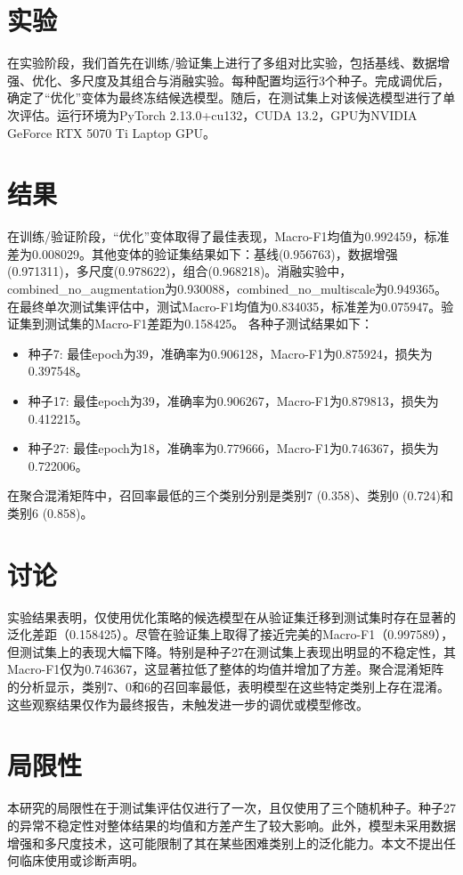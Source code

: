 \documentclass[10pt]{article}
\begin{document}
\section{实验}
在实验阶段，我们首先在训练/验证集上进行了多组对比实验，包括基线、数据增强、优化、多尺度及其组合与消融实验。每种配置均运行3个种子。完成调优后，确定了“优化”变体为最终冻结候选模型。随后，在测试集上对该候选模型进行了单次评估。运行环境为PyTorch 2.13.0+cu132，CUDA 13.2，GPU为NVIDIA GeForce RTX 5070 Ti Laptop GPU。
\section{结果}
在训练/验证阶段，“优化”变体取得了最佳表现，Macro-F1均值为0.992459，标准差为0.008029。其他变体的验证集结果如下：基线(0.956763)，数据增强(0.971311)，多尺度(0.978622)，组合(0.968218)。消融实验中，combined\_no\_augmentation为0.930088，combined\_no\_multiscale为0.949365。
在最终单次测试集评估中，测试Macro-F1均值为0.834035，标准差为0.075947。验证集到测试集的Macro-F1差距为0.158425。
各种子测试结果如下：
\begin{itemize}
\item 种子7: 最佳epoch为39，准确率为0.906128，Macro-F1为0.875924，损失为0.397548。
\item 种子17: 最佳epoch为39，准确率为0.906267，Macro-F1为0.879813，损失为0.412215。
\item 种子27: 最佳epoch为18，准确率为0.779666，Macro-F1为0.746367，损失为0.722006。
\end{itemize}
在聚合混淆矩阵中，召回率最低的三个类别分别是类别7 (0.358)、类别0 (0.724)和类别6 (0.858)。
\section{讨论}
实验结果表明，仅使用优化策略的候选模型在从验证集迁移到测试集时存在显著的泛化差距（0.158425）。尽管在验证集上取得了接近完美的Macro-F1（0.997589），但测试集上的表现大幅下降。特别是种子27在测试集上表现出明显的不稳定性，其Macro-F1仅为0.746367，这显著拉低了整体的均值并增加了方差。聚合混淆矩阵的分析显示，类别7、0和6的召回率最低，表明模型在这些特定类别上存在混淆。这些观察结果仅作为最终报告，未触发进一步的调优或模型修改。
\section{局限性}
本研究的局限性在于测试集评估仅进行了一次，且仅使用了三个随机种子。种子27的异常不稳定性对整体结果的均值和方差产生了较大影响。此外，模型未采用数据增强和多尺度技术，这可能限制了其在某些困难类别上的泛化能力。本文不提出任何临床使用或诊断声明。
\end{document}

